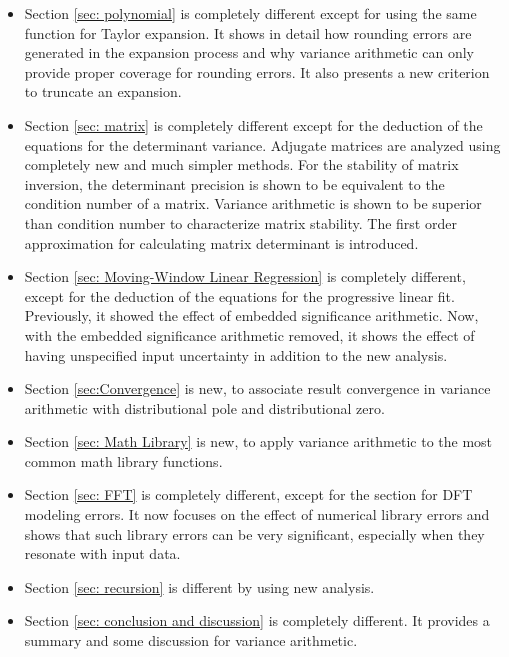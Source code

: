 \documentclass[twoside]{article}
\numberwithin{equation}{section}
\begin{document}
\begin{itemize}
\item Section \ref{sec: polynomial} is completely different except for using the same function for Taylor expansion.
It shows in detail how rounding errors are generated in the expansion process and why variance arithmetic can only provide proper coverage for rounding errors.
It also presents a new criterion to truncate an expansion.

\item Section \ref{sec: matrix} is completely different except for the deduction of the equations for the determinant variance.
Adjugate matrices are analyzed using completely new and much simpler methods.
For the stability of matrix inversion, the determinant precision is shown to be equivalent to the condition number of a matrix.
Variance arithmetic is shown to be superior than condition number to characterize matrix stability.
The first order approximation for calculating matrix determinant is introduced.

\item Section \ref{sec: Moving-Window Linear Regression} is completely different, except for the deduction of the equations for the progressive linear fit. 
Previously, it showed the effect of embedded significance arithmetic.
Now, with the embedded significance arithmetic removed, it shows the effect of having unspecified input uncertainty in addition to the new analysis.

\item Section \ref{sec:Convergence} is new, to associate result convergence in variance arithmetic with distributional pole and distributional zero.

\item Section \ref{sec: Math Library} is new, to apply variance arithmetic to the most common math library functions.

\item Section \ref{sec: FFT} is completely different, except for the section for DFT modeling errors.  
It now focuses on the effect of numerical library errors and shows that such library errors can be very significant, especially when they resonate with input data.

\item Section \ref{sec: recursion} is different by using new analysis.

\item Section \ref{sec: conclusion and discussion} is completely different.
It provides a summary and some discussion for variance arithmetic.

\end{itemize}
\end{document}
